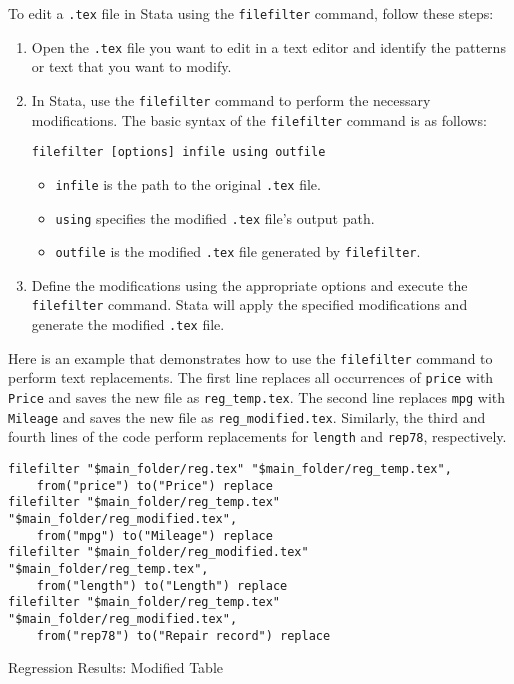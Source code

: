 \documentclass{article}
\begin{document}
To edit a \texttt{.tex} file in Stata using the \texttt{filefilter} command, follow these steps:

\begin{enumerate}
  \item Open the \texttt{.tex} file you want to edit in a text editor and identify the patterns or text that you want to modify.
  \item In Stata, use the \texttt{filefilter} command to perform the necessary modifications. The basic syntax of the \texttt{filefilter} command is as follows:
  
  \texttt{filefilter [options] infile using outfile}
  
  \begin{itemize}
      \item \texttt{infile} is the path to the original \texttt{.tex} file.
      \item \texttt{using} specifies the modified \texttt{.tex} file's output path.
      \item \texttt{outfile} is the modified \texttt{.tex} file generated by \texttt{filefilter}.
  \end{itemize}
  
  \item Define the modifications using the appropriate options and execute the \texttt{filefilter} command. Stata will apply the specified modifications and generate the modified \texttt{.tex} file.
\end{enumerate}

Here is an example that demonstrates how to use the \texttt{filefilter} command to perform text replacements. The first line replaces all occurrences of \texttt{price} with \texttt{Price} and saves the new file as \texttt{reg\_temp.tex}. The second line replaces \texttt{mpg} with \texttt{Mileage} and saves the new file as \texttt{reg\_modified.tex}. Similarly, the third and fourth lines of the code perform replacements for \texttt{length} and \texttt{rep78}, respectively.

\begin{verbatim}
filefilter "$main_folder/reg.tex" "$main_folder/reg_temp.tex",
    from("price") to("Price") replace
filefilter "$main_folder/reg_temp.tex" "$main_folder/reg_modified.tex",
    from("mpg") to("Mileage") replace
filefilter "$main_folder/reg_modified.tex" "$main_folder/reg_temp.tex",
    from("length") to("Length") replace
filefilter "$main_folder/reg_temp.tex" "$main_folder/reg_modified.tex",
    from("rep78") to("Repair record") replace
\end{verbatim}

\begin{table}
    \centering
    \caption{Regression Results: Modified Table}
    
\end{table}
\end{document}
